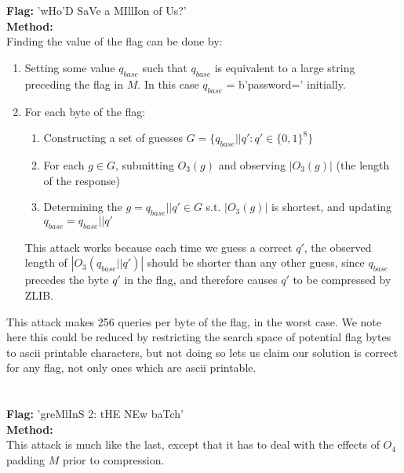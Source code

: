 \documentclass[]{article}
\begin{document}
\section{}
\textbf{Flag:} 'wHo'D SaVe a MIllIon of Us?'
\\
\textbf{Method:}
\\
Finding the value of the flag can be done by:
\begin{enumerate}
	\item Setting some value $q_{base}$ such that $q_{base}$ is equivalent to a large string preceding the flag in $M$. In this case $q_{base}$ = b'password=' initially.
	\item For each byte of the flag:
	\begin{enumerate}
		\item Constructing a set of guesses $G = \{q_{base} || q': q' \in \{0,1\}^8\}$
		\item For each $g \in G$, submitting $O_3(g)$ and observing $|O_3(g)|$ (the length of the response)
		\item Determining the $g =  q_{base} || q' \in G$ s.t. $|O_3(g)|$ is shortest, and updating $q_{base} = q_{base} || q'$
	\end{enumerate}
	This attack works because each time we guess a correct $q'$, the observed length of $|O_3( q_{base}  || q')|$ should be shorter than any other guess, since $q_{base}$ precedes the byte $q'$ in the flag, and therefore causes $q'$ to be compressed by ZLIB.
\end{enumerate}

This attack makes 256 queries per byte of the flag, in the worst case. We note here this could be reduced by restricting the search space of potential flag bytes to ascii printable characters, but not doing so lets us claim our solution is correct for any flag, not only ones which are ascii printable.

\section{}
\textbf{Flag:} 'greMlInS 2: tHE NEw baTch'
\\
\textbf{Method:}
\\
This attack is much like the last, except that it has to deal with the effects of $O_4$ padding $M$ prior to compression.
\end{document}
